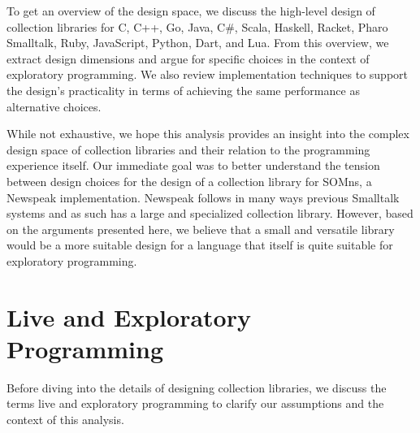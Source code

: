 \documentclass[sigconf, 10pt]{acmart}
\def\SOMns{SOM{\sc ns}\xspace}
\begin{document}
To get an overview of the design space,
we discuss the high-level design of collection libraries for
C, C++, Go, Java, C\#, Scala, Haskell, Racket, Pharo Smalltalk, Ruby, JavaScript, Python, Dart, and Lua.
From this overview, we extract design dimensions and 
argue for specific choices in the context of exploratory programming.
We also review implementation techniques
to support the design's practicality
in terms of achieving the same performance as alternative choices.

%
%
While not exhaustive, we hope this analysis provides an insight
into the complex design space of collection libraries
and their relation to the programming experience itself.
Our immediate goal was to better understand the tension between design choices
for the design of a collection library for \SOMns, a Newspeak implementation\citep{Bracha:10:NS,OptCELWithTruffle}.
Newspeak follows in many ways previous Smalltalk systems
and as such has a large and specialized collection library.
However, based on the arguments presented here,
we believe that a small and versatile library would be a more suitable design
for a language that itself is quite suitable for exploratory programming.


\section{Live and Exploratory Programming}
\label{sec:exploratory}

Before diving into the details of designing collection libraries,
we discuss the terms live and exploratory programming
to clarify our assumptions and the context of this analysis.
\end{document}
